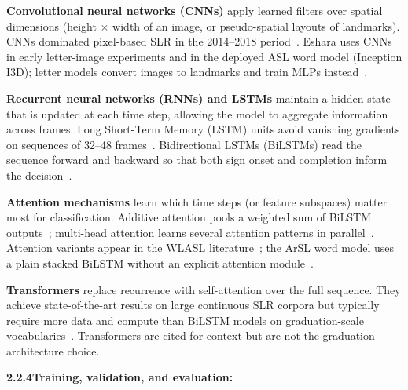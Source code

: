 \noindent \textbf{Convolutional neural networks (CNNs)} apply learned filters over spatial dimensions (height $\times$ width of an image, or pseudo-spatial layouts of landmarks). CNNs dominated pixel-based SLR in the 2014--2018 period~\cite{he2016deep,sandler2018mobilenetv2}. Eshara uses CNNs in early letter-image experiments and in the deployed ASL word model (Inception I3D); letter models convert images to landmarks and train MLPs instead~\cite{zhang2020mediapipe,li2020wlasl}.\par\vspace{0.3cm}

\noindent \textbf{Recurrent neural networks (RNNs) and LSTMs} maintain a hidden state that is updated at each time step, allowing the model to aggregate information across frames. Long Short-Term Memory (LSTM) units avoid vanishing gradients on sequences of 32--48 frames~\cite{hochreiter1997long,pascanu2013difficulty}. Bidirectional LSTMs (BiLSTMs) read the sequence forward and backward so that both sign onset and completion inform the decision~\cite{schuster1997bidirectional,pigou2018sign}.\par\vspace{0.3cm}

\noindent \textbf{Attention mechanisms} learn which time steps (or feature subspaces) matter most for classification. Additive attention pools a weighted sum of BiLSTM outputs~\cite{bahdanau2015neural}; multi-head attention learns several attention patterns in parallel~\cite{vaswani2017attention}. Attention variants appear in the WLASL literature~\cite{li2020wlasl}; the ArSL word model uses a plain stacked BiLSTM without an explicit attention module~\cite{sidig2021karsl}.\par\vspace{0.3cm}

\noindent \textbf{Transformers} replace recurrence with self-attention over the full sequence. They achieve state-of-the-art results on large continuous SLR corpora but typically require more data and compute than BiLSTM models on graduation-scale vocabularies~\cite{vaswani2017attention,duarte2021how2sign}. Transformers are cited for context but are not the graduation architecture choice.\par\vspace{0.2cm}

\noindent\textbf{2.2.4\quad Training, validation, and evaluation:}\par
{}
\vspace{0.3cm}

